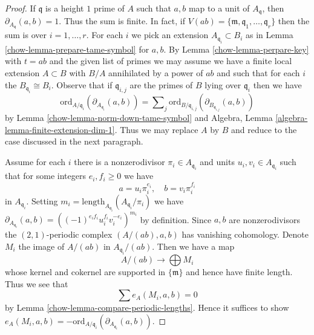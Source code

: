 \begin{proof}

If $\mathfrak q$ is a height $1$ prime of $A$ such that $a, b$
map to a unit of $A_\mathfrak q$, then $\partial_{A_\mathfrak q}(a, b) = 1$.
Thus the sum is finite. In fact, if
$V(ab) = \{\mathfrak m, \mathfrak q_1, \ldots, \mathfrak q_r\}$
then the sum is over $i = 1, \ldots, r$.
For each $i$ we pick an extension $A_{\mathfrak q_i} \subset B_i$
as in Lemma \ref{chow-lemma-prepare-tame-symbol} for $a, b$.
By Lemma \ref{chow-lemma-perpare-key} with $t = ab$ and the given list of primes
we may assume we have a finite local extension $A \subset B$
with $B/A$ annihilated by a power of $ab$ and such that
for each $i$ the $B_{\mathfrak q_i} \cong B_i$.
Observe that if $\mathfrak q_{i, j}$ are the primes of $B$
lying over $\mathfrak q_i$ then we have
$$
\text{ord}_{A/\mathfrak q_i}(\partial_{A_{\mathfrak q_i}}(a, b))
=
\sum\nolimits_j
\text{ord}_{B/\mathfrak q_{i, j}}(\partial_{B_{\mathfrak q_{i, j}}}(a, b))
$$
by Lemma \ref{chow-lemma-norm-down-tame-symbol} and
Algebra, Lemma \ref{algebra-lemma-finite-extension-dim-1}.
Thus we may replace $A$ by $B$ and
reduce to the case discussed in the next paragraph.

\medskip\noindent
Assume for each $i$ there is a nonzerodivisor
$\pi_i \in A_{\mathfrak q_i}$ and units $u_i, v_i \in A_{\mathfrak q_i}$
such that for some integers $e_i, f_i \geq 0$ we have
$$
a = u_i \pi_i^{e_i},\quad b = v_i \pi_i^{f_i}
$$
in $A_{\mathfrak q_i}$. Setting
$m_i = \text{length}_{A_{\mathfrak q_i}}(A_{\mathfrak q_i}/\pi_i)$
we have
$\partial_{A_{\mathfrak q_i}}(a, b) =
((-1)^{e_if_i}u_i^{f_i}v_i^{-e_i})^{m_i}$ by definition.
Since $a, b$ are nonzerodivisors the
$(2, 1)$-periodic complex $(A/(ab), a, b)$ has vanishing cohomology.
Denote $M_i$ the image of $A/(ab)$ in $A_{\mathfrak q_i}/(ab)$.
Then we have a map
$$
A/(ab) \longrightarrow \bigoplus M_i
$$
whose kernel and cokernel are supported in $\{\mathfrak m\}$
and hence have finite length. Thus we see that
$$
\sum e_A(M_i, a, b) = 0
$$
by Lemma \ref{chow-lemma-compare-periodic-lengths}. Hence it suffices to show
$e_A(M_i, a, b) =
- \text{ord}_{A/\mathfrak q_i}(\partial_{A_{\mathfrak q_i}}(a, b))$.


\end{proof}
